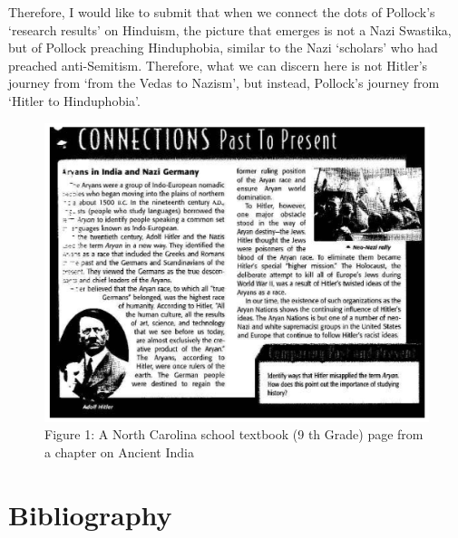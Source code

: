 Therefore, I would like to submit that when we connect the dots of Pollock’s ‘research results’ on Hinduism, the picture that emerges is not a Nazi Swastika, but of Pollock preaching Hinduphobia, similar to the Nazi ‘scholars’ who had preached anti-Semitism. Therefore, what we can discern here is not Hitler’s journey from ‘from the Vedas to Nazism’, but instead, Pollock’s journey from ‘Hitler to Hinduphobia’.

\begin{figure}
\includegraphics{images/chap8-1.jpg}
\caption{Figure 1: A North Carolina school textbook (9 th Grade) page from a chapter on Ancient India}
\end{figure}


\section*{Bibliography}

